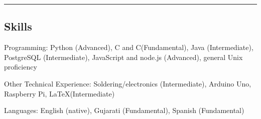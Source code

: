 \documentclass[10pt,letterpaper]{article}
\newenvironment{indentsection}[1]%
{\begin{list}{}%
	{\setlength{\leftmargin}{#1}}%
	\item[]%
}
{\end{list}}
\newcommand{\CPP}
{C\nolinebreak[4]\hspace{-.05em}\raisebox{.22ex}{\footnotesize\bf ++}}
\begin{document}

\hrule
\vspace{-0.4em}
\subsection*{Skills}

\begin{indentsection}{\parindent}
\begin{description*}
	\item[Programming:]
	Python (Advanced), C and \CPP (Fundamental), Java (Intermediate), PostgreSQL (Intermediate), JavaScript and node.js (Advanced), general Unix proficiency
	\item[Other Technical Experience:]
	Soldering/electronics (Intermediate), Arduino Uno, Raspberry Pi, \LaTeX (Intermediate)
	\item[Languages:]
	English (native), Gujarati (Fundamental), Spanish (Fundamental)
\end{description*}
\end{indentsection}
\end{document}
